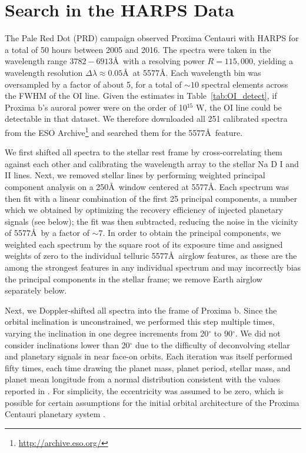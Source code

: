 \documentclass[apjl]{emulateapj}
\begin{document}
\section{Search in the HARPS Data}
\label{sec:search}
The Pale Red Dot (PRD) campaign \citep{Anglada-Escude2016} observed Proxima Centauri with HARPS for a total of 50 hours between 2005 and 2016. The spectra were taken in the wavelength range $3782-6913$\AA\ with a resolving power $R = 115,000$, yielding a wavelength resolution $\Delta\lambda \approx 0.05$\AA\ at 5577\AA. Each wavelength bin was oversampled by a factor of about 5, for a total of ${\sim} 10$ spectral elements across the FWHM of the OI line. Given the estimates in Table~\ref{tab:OI_detect}, if Proxima b's auroral power were on the order of 10$^{15}$ W, the OI line could be detectable in that dataset. We therefore downloaded all 251 calibrated spectra from the ESO Archive\footnote{\url{http://archive.eso.org/}} and searched them for the 5577\AA\ feature.

We first shifted all spectra to the stellar rest frame by cross-correlating them against each other and calibrating the wavelength array to the stellar Na D I and II lines. Next, we removed stellar lines by performing weighted principal component analysis \citep[WPCA;][]{Delchambre2015} on a 250\AA\ window centered at 5577\AA. Each spectrum was then fit with a linear combination of the first 25 principal components, a number which we obtained by optimizing the recovery efficiency of injected planetary signals (see below); the fit was then subtracted, reducing the noise in the vicinity of 5577\AA\ by a factor of ${\sim} 7$. In order to obtain the principal components, we weighted each spectrum by the square root of its exposure time and assigned weights of zero to the individual telluric 5577\AA\ airglow features, as these are the among the strongest features in any individual spectrum and may incorrectly bias the principal components in the stellar frame; we remove Earth airglow separately below.

Next, we Doppler-shifted all spectra into the frame of Proxima b. Since the orbital inclination is unconstrained, we performed this step multiple times, varying the inclination in one degree increments from 20$^\circ$ to 90$^\circ$. We did not consider inclinations lower than 20$^\circ$ due to the difficulty of deconvolving stellar and planetary signals in near face-on orbits. Each iteration was itself performed fifty times, each time drawing the planet mass, planet period, stellar mass, and planet mean longitude from a normal distribution consistent with the values reported in \citet{Anglada-Escude2016}. For simplicity, the eccentricity was assumed to be zero, which is possible for certain assumptions for the initial orbital architecture of the Proxima Centauri planetary system \citep{Barnes2016}.
\end{document}
